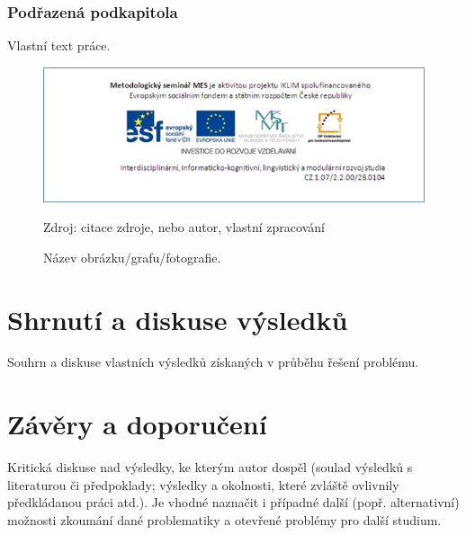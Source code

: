 \subsubsection{Podřazená podkapitola}

Vlastní text práce.

\begin{figure}[htb!]
\includegraphics{img/MES.png}
\caption{Název obrázku/grafu/fotografie.}
Zdroj: citace zdroje, nebo autor, vlastní zpracování
\end{figure} 


\section{Shrnutí a diskuse výsledků}

Souhrn a diskuse vlastních výsledků získaných v průběhu řešení problému. 


\section{Závěry a doporučení}

Kritická diskuse nad výsledky, ke kterým autor dospěl (soulad výsledků s literaturou či předpoklady; výsledky a okolnosti, které zvláště ovlivnily předkládanou práci atd.). Je vhodné naznačit i případné další (popř. alternativní) možnosti zkoumání dané problematiky a otevřené problémy pro další studium.
